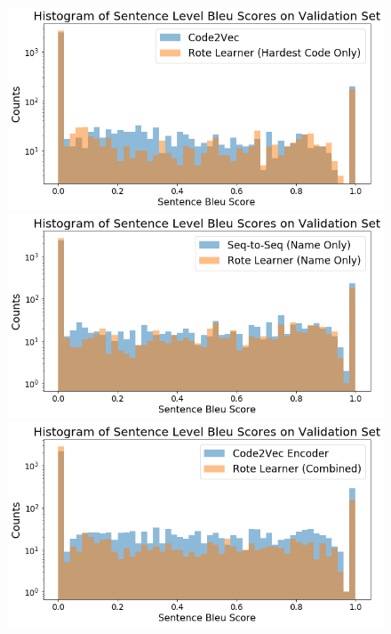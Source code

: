 \begin{figure}
\begin{center}
\includegraphics[width=0.8\linewidth]{ImagesCodeRelated/SentenceBleuCodeonly.png}
\includegraphics[width=.8\linewidth]{ImagesCodeRelated/SentenceBleuNameOnly.png}
\includegraphics[width=.8\linewidth]{ImagesCodeRelated/SentBleuCombined.png}
\end{center}
\end{figure}



